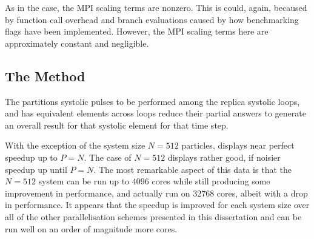 As in the \systolicloop{} case, the MPI scaling terms are nonzero.
%
This is could, again, becaused by function call overhead and
branch evaluations caused by how benchmarking flags have been implemented.
%
However, the MPI scaling terms here are approximately constant and negligible.


\subsection{The \pairoperation{} Method}

The \pairoperation{} partitions systolic pulses to be performed among
the replica systolic loops, and has equivalent elements across loops
reduce their partial answers to generate an overall result for that
systolic element for that time step.

%
%
\begin{figure}[!h]
    
    \caption{
        \vZeroSpeedupCaption
            {\replicatedsystolicloop{}}
            {\pairoperation{}}
    }
    \label{fig:v1_replicated_systolic_pair_operation_speedups}
\end{figure}


\vZeroSpeedupExplanation
    {}
    {\replicatedsystolicloop{}}
    {\pairoperation{}}


%
With the exception of the system size $N = 512$ particles,
displays near perfect speedup up to $P = N$.
%
The case of $N = 512$ displays rather good, if noisier speedup up
until $P = N$.
%
The most remarkable aspect of this data is that the $N = 512$ system can
be run up to $4096$ cores while still producing some
improvement in performance,
and actually run on $32768$ cores, albeit with a drop
in performance.
%
It appears that the speedup is improved for each system size over all of
the other parallelisation schemes presented in this dissertation
and can be run well on an order of magnitude more cores.

